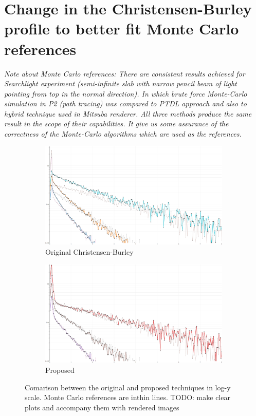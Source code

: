 \section{Change in the Christensen-Burley profile to better fit Monte
Carlo references}

\textit{Note about Monte Carlo references:
There are consistent results achieved for Searchlight experiment
(semi-infinite slab with narrow pencil beam of light pointing from top in the normal
direction). In which brute force Monte-Carlo simulation in P2 (path tracing) was
compared to PTDL approach and also to hybrid technique used in Mitsuba
renderer. All three methods produce the same result in the scope of their
capabilities. It give us some assurance of the correctness of the Monte-Carlo
algorithms which are used as the references.}


\begin{figure}
    \centering
    \begin{subfigure}{0.48\textwidth}
        \includegraphics[width=\textwidth]{imgs/plots/burley_old_fitting}
        \caption{Original Christensen-Burley}
    \end{subfigure}
    \quad
    \begin{subfigure}{0.48\textwidth}
        \includegraphics[width=\textwidth]{imgs/plots/burley_new_fitting}
        \caption{Proposed}
    \end{subfigure}

    \caption{Comarison between the original and proposed techniques in log-y
    scale. Monte Carlo references are inthin lines. TODO: make clear plots and
    accompany them with rendered images}
    \label{fig:burley_fitting}
\end{figure}

